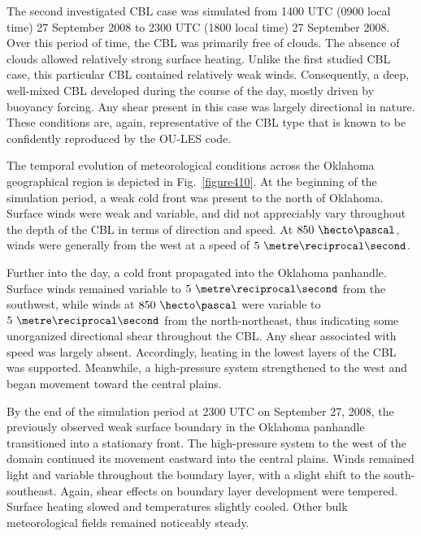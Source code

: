 The second investigated CBL case was simulated from 1400 UTC (0900 local time) 27 September 2008 to 2300 UTC (1800 local time) 27 September 2008. Over this period of time, the CBL was primarily free of clouds. The absence of clouds allowed relatively strong surface heating. Unlike the first studied CBL case, this particular CBL contained relatively weak winds. Consequently, a deep, well-mixed CBL developed during the course of the day, mostly driven by buoyancy forcing. Any shear present in this case was largely directional in nature. These conditions are, again, representative of the CBL type that is known to be confidently reproduced by the OU-LES code. 

The temporal evolution of meteorological conditions across the Oklahoma geographical region is depicted in Fig.~\ref{figure410}. At the beginning of the simulation period, a weak cold front was present to the north of Oklahoma. Surface winds were weak and variable, and did not appreciably vary throughout the depth of the CBL in terms of direction and speed. At $850\mbox{ }\hecto\pascal$, winds were generally from the west at a speed of $5\mbox{ }\metre\reciprocal\second$. 

Further into the day, a cold front propagated into the Oklahoma panhandle. Surface winds remained variable to $5\mbox{ }\metre\reciprocal\second$ from the southwest, while winds at $850\mbox{ }\hecto\pascal$ were variable to $5\mbox{ }\metre\reciprocal\second$ from the north-northeast, thus indicating some unorganized directional shear throughout the CBL. Any shear associated with speed was largely absent. Accordingly, heating in the lowest layers of the CBL was supported. Meanwhile, a high-pressure system strengthened to the west and began movement toward the central plains.

By the end of the simulation period at 2300 UTC on September 27, 2008, the previously observed weak surface boundary in the Oklahoma panhandle transitioned into a stationary front. The high-pressure system to the west of the domain continued its movement eastward into the central plains. Winds remained light and variable throughout the boundary layer, with a slight shift to the south-southeast. Again, shear effects on boundary layer development were tempered. Surface heating slowed and temperatures slightly cooled. Other bulk meteorological fields remained noticeably steady.


